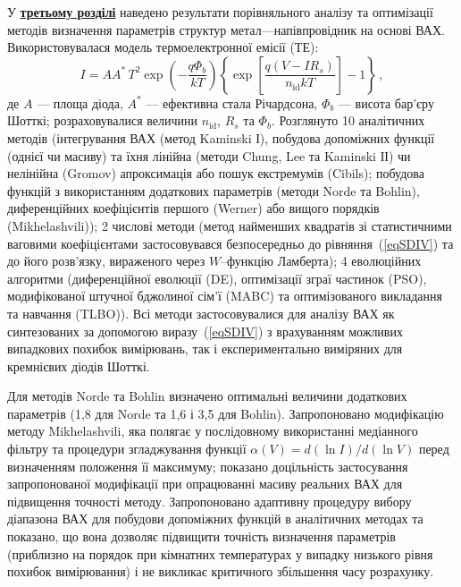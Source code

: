 У  \underline{\textbf{третьому розділі}} наведено результати порівняльного аналізу та оптимізації методів
визначення параметрів структур
метал---напівпровідник на основі ВАХ.
Використовувалася модель термоелектронної емісії (ТЕ):
\begin{equation}\label{eqSDIV}
I=AA^*\,T^2\exp\left(-\frac{q\Phi_b}{kT}\right)\left\{\exp\left[\frac{q(V-IR_s)}{n_\mathrm{id}kT}\right]-1\right\}\,,
\end{equation}
де
$A$ --- площа діода,
$A^*$ --- ефективна стала Річардсона,
$\Phi_b$ --- висота бар'єру Шотткі;
розраховувалися величини $n_\mathrm{id}$, $R_s$ та $\Phi_b$.
Розглянуто 10 аналітичних методів (інтегрування ВАХ (метод Kaminski І),
побудова допоміжних функції (однієї чи масиву) та їхня лінійна (методи Chung, Lee та Kaminski ІІ)
чи нелінійна (Gromov) апроксимація або пошук екстремумів (Cibils);
побудова функцій з використанням додаткових параметрів (методи Norde та Bohlin),
диференційних коефіцієнтів першого (Werner) або вищого порядків (Mikhelashvili));
2 числові методи (метод найменших квадратів зі статистичними ваговими коефіцієнтами
застосовувався безпосередньо до рівняння~(\ref{eqSDIV}) та до його розв'язку, вираженого через $W$--функцію Ламберта);
4 еволюційних алгоритми (диференційної еволюції (DE),
оптимізації зграї частинок (PSO),
модифікованої штучної бджолиної сім'ї (MABC) та
оптимізованого викладання та навчання (TLBO)).
Всі методи застосовувалися для аналізу ВАХ як 
синтезованих за допомогою виразу~(\ref{eqSDIV}) з врахуванням можливих випадкових похибок вимірювань,
так і експериментально виміряних для кремнієвих діодів Шотткі.

Для методів Norde та Bohlin визначено  оптимальні величини додаткових параметрів (1,8 для Norde та 1,6 і 3,5 для Bohlin).
Запропоновано модифікацію методу Mikhelashvili, яка
полягає у послідовному використанні медіанного фільтру та процедури згладжування функції $\alpha(V)=d(\ln I)/d(\ln V)$ перед визначенням положення її максимуму;
показано доцільність застосування запропонованої модифікації при опрацюванні масиву реальних ВАХ для підвищення точності методу.
Запропоновано адаптивну процедуру вибору діапазона ВАХ для побудови допоміжних функцій в аналітичних методах та показано, що вона дозволяє підвищити точність визначення параметрів (приблизно на порядок при кімнатних температурах у випадку низького рівня похибок вимірювання) і не викликає критичного збільшення часу розрахунку.



